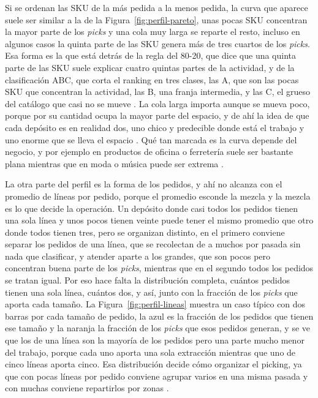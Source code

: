 Si se ordenan las SKU de la más pedida a la menos pedida, la curva que aparece suele ser similar a la de la Figura~\ref{fig:perfil-pareto}, unas pocas SKU concentran la mayor parte de los \emph{picks} y una cola muy larga se reparte el resto, incluso en algunos casos la quinta parte de las SKU genera más de tres cuartos de los \emph{picks}.
Esa forma es la que está detrás de la regla del 80-20, que dice que una quinta parte de las SKU suele explicar cuatro quintas partes de la actividad, y de la clasificación ABC, que corta el ranking en tres clases, las A, que son las pocas SKU que concentran la actividad, las B, una franja intermedia, y las C, el grueso del catálogo que casi no se mueve \citep[sección~14.2]{bartholdi2014warehouse}.
La cola larga importa aunque se mueva poco, porque por su cantidad ocupa la mayor parte del espacio, y de ahí la idea de que cada depósito es en realidad dos, uno chico y predecible donde está el trabajo y uno enorme que se lleva el espacio \citep[sección~2.3]{bartholdi2014warehouse}.
Qué tan marcada es la curva depende del negocio, y por ejemplo en productos de oficina o ferretería suele ser bastante plana mientras que en moda o música puede ser extrema \citep[sección~14.2]{bartholdi2014warehouse}.

La otra parte del perfil es la forma de los pedidos, y ahí no alcanza con el promedio de líneas por pedido, porque el promedio esconde la mezcla y la mezcla es lo que decide la operación.
Un depósito donde casi todos los pedidos tienen una sola línea y unos pocos tienen veinte puede tener el mismo promedio que otro donde todos tienen tres, pero se organizan distinto, en el primero conviene separar los pedidos de una línea, que se recolectan de a muchos por pasada sin nada que clasificar, y atender aparte a los grandes, que son pocos pero concentran buena parte de los \emph{picks}, mientras que en el segundo todos los pedidos se tratan igual.
Por eso hace falta la distribución completa, cuántos pedidos tienen una sola línea, cuántos dos, y así, junto con la fracción de los \emph{picks} que aporta cada tamaño.
La Figura~\ref{fig:perfil-lineas} muestra un caso típico con dos barras por cada tamaño de pedido, la azul es la fracción de los pedidos que tienen ese tamaño y la naranja la fracción de los \emph{picks} que esos pedidos generan, y se ve que los de una línea son la mayoría de los pedidos pero una parte mucho menor del trabajo, porque cada uno aporta una sola extracción mientras que uno de cinco líneas aporta cinco.
Esa distribución decide cómo organizar el picking, ya que con pocas líneas por pedido conviene agrupar varios en una misma pasada y con muchas conviene repartirlos por zonas \citep[sección~14.2]{bartholdi2014warehouse}.

